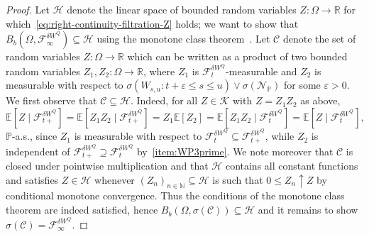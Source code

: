 \documentclass[reqno]{amsart}
\numberwithin{equation}{section}
\newcommand{\bbP}{\mathbb{P}}
\newcommand{\bbR}{\mathbb{R}}
\newcommand{\N}{\mathbb{N}}
\newcommand{\E}{\mathbb{E}}
\newcommand{\cF}{\mathcal{F}}
\newcommand{\cK}{\mathcal{K}}
\newcommand{\cN}{\mathcal{N}}
\newcommand{\from}{\colon}
\theoremstyle{remark}
\theoremstyle{definition}
\begin{document}
\begin{proof}
	Let $\mathscr H$ denote the linear space of bounded random variables
	$Z \from \Omega \to \bbR$ for which~\eqref{eq:right-continuity-filtration-Z}
	holds; we want to show that $B_b(\Omega, \cF_{\infty}^{\delta W^Q}) \subseteq \mathscr H$
	using the monotone class theorem~\cite[Chapter~0, Theorem~2.2]{RevuzYor1999}.
	Let $\mathscr C$ denote
	the set of random variables
	$Z \from \Omega\to\bbR$
	which can be written as a product of
	two bounded random variables $Z_1, Z_2 \from \Omega\to\bbR$, 
	where $Z_1$ is $\cF_t^{\delta W^Q}$-measurable
	and
	$Z_2$ is measurable with respect to 
	$\sigma(W_{s,u} : t + \varepsilon \le s \le u) \vee \sigma(\cN_{\bbP})$
	for some $\varepsilon>0$.
	We first observe that $\mathscr C \subseteq \mathscr H$. Indeed,
	for all $Z \in \cK$ with $Z = Z_1 Z_2$ as above,
	\[
	\E[Z \mid \cF_{t+}^{\delta W^Q}]
	=
	\E[Z_1 Z_2 \mid \cF_{t+}^{\delta W^Q}]
	=
	Z_1 \E[Z_2]
	=
	\E[Z_1 Z_2 \mid \cF_{t}^{\delta W^Q}]
	=
	\E[Z \mid \cF_{t}^{\delta W^Q}],
	\]
	$\bbP$-a.s.,
	since $Z_1$ is measurable with respect to 
	$\cF_{t}^{\delta W^Q} \subseteq \cF_{t+}^{\delta W^Q}$,
	while $Z_2$ is independent of 
	$\cF_{t+}^{\delta W^Q} \supseteq \cF_{t}^{\delta W^Q}$ by~\eqref{item:WP3prime}. 
	We note moreover
	that $\mathscr C$ is closed under pointwise multiplication and that
	$\mathscr H$ 
	contains all
	constant functions and satisfies $Z \in \mathscr H$ whenever
	$(Z_n)_{n\in\N} \subseteq \mathscr H$ is such that $0 \le Z_n \uparrow Z$ by conditional
	monotone convergence.
	Thus the conditions of the monotone class theorem are indeed satisfied, hence
	$B_b(\Omega, \sigma(\mathscr C)) \subseteq \mathscr H$
	and it remains to show $\sigma(\mathscr C) = \cF^{\delta W^Q}_{\infty}$\!.
	

\end{proof}
\end{document}
